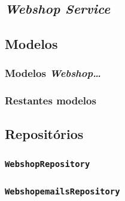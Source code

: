 \newpage

\subsection{\textit{Webshop Service}}



\subsection{Modelos}

\subsubsection*{Modelos \textit{Webshop\ldots}}

\subsubsection*{Restantes modelos}

\subsection{Repositórios}

\subsubsection*{\texttt{WebshopRepository}}

\subsubsection*{\texttt{WebshopemailsRepository}}

\newpage